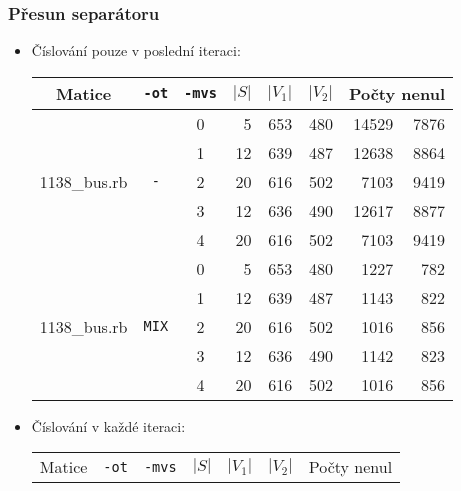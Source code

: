 \documentclass{beamer}
\begin{document}
\begin{frame}
    \frametitle{Přesun separátoru}
    \begin{itemize}
      \item Číslování pouze v poslední iteraci:
      \begin{table}[ht]
        \tiny
        \centering
        \renewcommand{\arraystretch}{1.15}
        \begin{tabular}{|l|c|c|r|r|r|r|r|}
          \hline
          \multicolumn{1}{|c|}{Matice} & \multicolumn{1}{|c|}{\texttt{-ot}}  &\multicolumn{1}{|c|}{\texttt{-mvs}} &\multicolumn{1}{|c|}{$|S|$} & \multicolumn{1}{|c|}{$|V_1|$}& \multicolumn{1}{|c|}{$|V_2|$} & \multicolumn{2}{c|}{Počty nenul} \\
          \hline
          \multirow{5}{*}{1138\_bus.rb}
          & \multirow{5}{*}{\texttt{-}} & 0 
          &	5	&	653	&	480	& 14529	&	7876 \\
          & & 1 
          &	12	&	639	&	487	&	12638	&	8864	\\
          & & 2
          &	20	&	616	&	502	&	7103	&	9419	\\
          & & 3
          &	12	&	636	&	490	&	12617	&	8877	\\
          & & 4
          &	20	&	616	&	502	&	7103	&	9419	\\
          \hline
          \multirow{5}{*}{1138\_bus.rb}
          & \multirow{5}{*}{\texttt{MIX}} & 0 
          &	5	&	653	&	480	& 1227	&	782 \\
          & & 1 
          &	12	&	639	&	487	&	1143	&	822	\\
          & & 2
          &	20	&	616	&	502	&	1016	&	856	\\
          & & 3
          &	12	&	636	&	490	&	1142	&	823	\\
          & & 4
          &	20	&	616	&	502	&	1016	&	856	\\
        \hline
        \end{tabular}
      \end{table}
    \item Číslování v každé iteraci:
    \begin{table}[ht]
      \tiny
      \centering
      \renewcommand{\arraystretch}{1.15}
      \begin{tabular}{|l|c|c|r|r|r|r|r|}
        \hline
        \multicolumn{1}{|c|}{Matice} & \multicolumn{1}{|c|}{\texttt{-ot}}  &\multicolumn{1}{|c|}{\texttt{-mvs}} &\multicolumn{1}{|c|}{$|S|$} & \multicolumn{1}{|c|}{$|V_1|$}& \multicolumn{1}{|c|}{$|V_2|$} & \multicolumn{2}{c|}{Počty nenul} \\

\end{tabular}
\end{table}
\end{itemize}
\end{frame}
\end{document}
